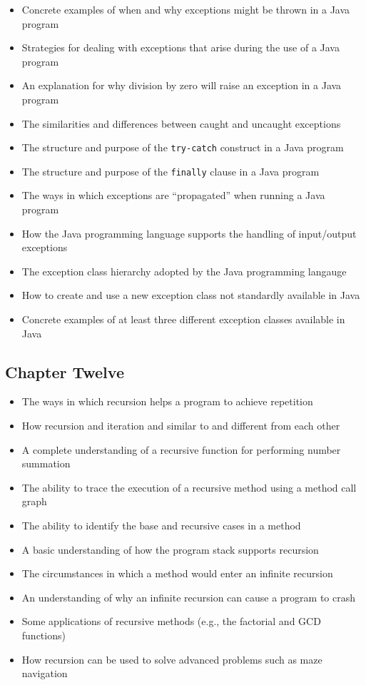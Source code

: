 \documentclass[11pt]{article}
\begin{document}
\begin{itemize}

  \item Concrete examples of when and why exceptions might be thrown in a Java program
  \item Strategies for dealing with exceptions that arise during the use of a Java program
  \item An explanation for why division by zero will raise an exception in a Java program
  \item The similarities and differences between caught and uncaught exceptions
  \item The structure and purpose of the {\tt try-catch} construct in a Java program
  \item The structure and purpose of the {\tt finally} clause in a Java program
  \item The ways in which exceptions are ``propagated'' when running a Java program
  \item How the Java programming language supports the handling of input/output exceptions
  \item The exception class hierarchy adopted by the Java programming langauge
  \item How to create and use a new exception class not standardly available in Java
  \item Concrete examples of at least three different exception classes available in Java

\end{itemize}

\subsection*{Chapter Twelve}

\begin{itemize}

  \item The ways in which recursion helps a program to achieve repetition
  \item How recursion and iteration and similar to and different from each other
  \item A complete understanding of a recursive function for performing number summation
  \item The ability to trace the execution of a recursive method using a method call graph
  \item The ability to identify the base and recursive cases in a method
  \item A basic understanding of how the program stack supports recursion
  \item The circumstances in which a method would enter an infinite recursion
  \item An understanding of why an infinite recursion can cause a program to crash
  \item Some applications of recursive methods (e.g., the factorial and GCD functions)
  \item How recursion can be used to solve advanced problems such as maze navigation

\end{itemize}
\end{document}
